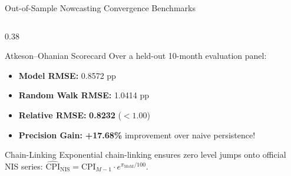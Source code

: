 \documentclass[aspectratio=169, 10pt]{beamer}
\begin{document}
\begin{frame}{Out-of-Sample Nowcasting Convergence Benchmarks}
\begin{columns}
    \begin{column}{0.38\textwidth}
      \begin{exampleblock}{Atkeson--Ohanian Scorecard}
        Over a held-out 10-month evaluation panel:
        \begin{itemize}
          \item \textbf{Model RMSE:} 0.8572 pp
          \item \textbf{Random Walk RMSE:} 1.0414 pp
          \item \textbf{Relative RMSE:} \textbf{0.8232} ($< 1.00$)
          \item \textbf{Precision Gain:} \textbf{+17.68\%} improvement over naive persistence!
        \end{itemize}
      \end{exampleblock}

      \begin{alertblock}{Chain-Linking}
        Exponential chain-linking ensures zero level jumps onto official NIS series:
        $\widehat{\text{CPI}}_{\text{NIS}} = \text{CPI}_{M-1} \cdot e^{\pi_{\text{MoM}} / 100}$.
      \end{alertblock}
    \end{column}
  \end{columns}
\end{frame}
\end{document}

